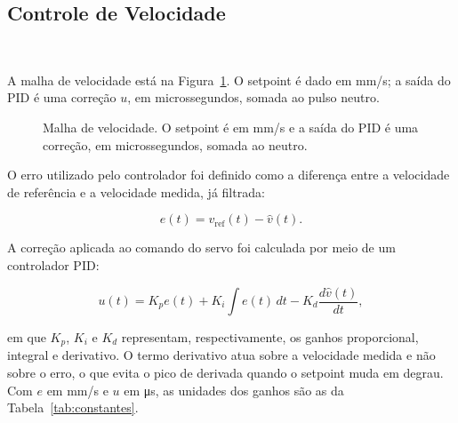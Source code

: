 \documentclass[12pt]{article}
\begin{document}
\subsection{Controle de Velocidade}\

A malha de velocidade está na Figura~\ref{fig:malha}. O setpoint é dado em mm/s; a saída do PID é uma correção $u$, em microssegundos, somada ao pulso neutro.

\begin{figure}[H]
  \centering
  \caption{Malha de velocidade. O setpoint é em mm/s e a saída do PID é uma correção, em microssegundos, somada ao neutro.}
  \label{fig:malha}
\end{figure}

O erro utilizado pelo controlador foi definido como a diferença entre a velocidade de referência e a velocidade medida, já filtrada:

\begin{equation}
    e(t) = v_{\mathrm{ref}}(t) - \hat v(t).
\end{equation}

A correção aplicada ao comando do servo foi calculada por meio de um controlador PID:

\begin{equation}
    u(t)
    =
    K_p e(t)
    +
    K_i \int e(t)\,dt
    -
    K_d \frac{d\hat v(t)}{dt},
    \label{eq:pid}
\end{equation}

em que $K_p$, $K_i$ e $K_d$ representam, respectivamente, os ganhos proporcional, integral e derivativo. O termo derivativo atua sobre a velocidade medida e não sobre o erro, o que evita o pico de derivada quando o setpoint muda em degrau. Com $e$ em mm/s e $u$ em \si{\micro\second}, as unidades dos ganhos são as da Tabela~\ref{tab:constantes}.
\end{document}
